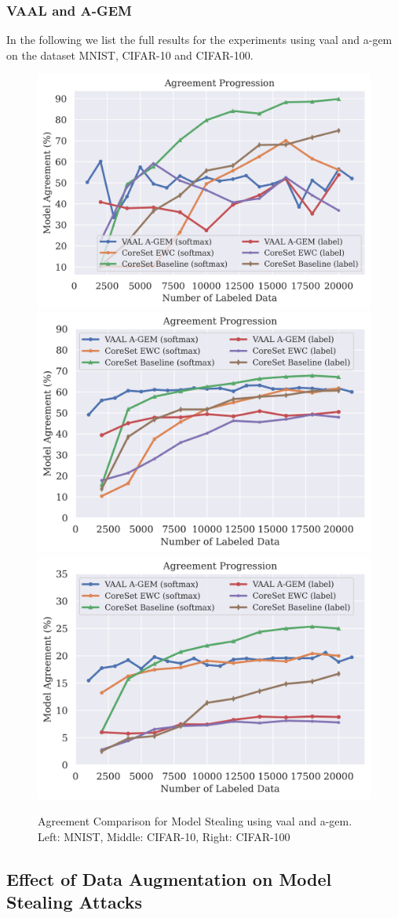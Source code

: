 \subsubsection{VAAL and A-GEM}
\label{sec:Appendix:CALMS:VAALAGEM}
In the following we list the full results for the experiments using \gls{vaal} and \gls{a-gem} on the dataset MNIST, CIFAR-10 and CIFAR-100.
\begin{figure}[!htb]
    \centering
    \includegraphics[width=0.3\linewidth]{images/results_CALMS/mnist_vaal_agem.png} \hfill
    \includegraphics[width=0.3\linewidth]{images/results_CALMS/cifar_vaal_agem.png} \hfill
    \includegraphics[width=0.3\linewidth]{images/results_CALMS/cifar100_vaal_agem.png}
    \caption{Agreement Comparison for Model Stealing using \gls{vaal} and \gls{a-gem}. Left: MNIST, Middle: CIFAR-10, Right: CIFAR-100}
    \label{fig:CALMS_VAAL_AGEM}
\end{figure}



\subsection{Effect of Data Augmentation on Model Stealing Attacks}
\label{sec:Appendix:EffectDataAugmentation}

